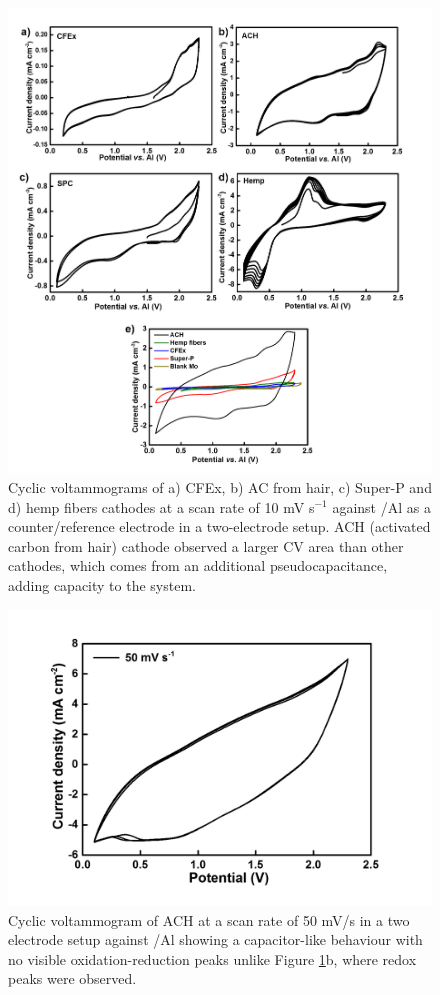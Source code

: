\documentclass{article}
\begin{document}
 \begin{figure}
  \centering
  \includegraphics[width=\textwidth]{fig/CV}
    \caption{Cyclic voltammograms of a) CFEx, b) AC from hair, c) Super-P and d) hemp fibers cathodes at a scan rate of 10 mV s$^{-1}$ against /Al as a counter/reference electrode in a two-electrode setup. ACH (activated carbon from hair) cathode observed a larger CV area than other cathodes, which comes from an additional pseudocapacitance, adding capacity to the system.}
  \label{fig:CV}
\end{figure}

\begin{figure}%
\centering
\includegraphics[width=\textwidth]{fig/hair50mVs}
\caption{Cyclic voltammogram of ACH at a scan rate of 50 mV/s in a two electrode setup against /Al showing a capacitor-like behaviour with no visible oxidation-reduction peaks unlike Figure \ref{fig:CV}b, where redox peaks were observed.}
\label{fig:hair50mVs}
\end{figure}
\end{document}
